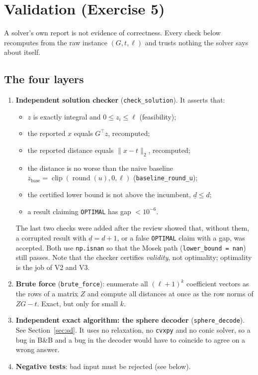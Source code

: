 \documentclass[11pt,a4paper]{article}
\newcommand{\norm}[1]{\lVert #1\rVert_2}
\newcommand{\BB}{B\&B}
\begin{document}
\section{Validation (Exercise 5)}

A solver's own report is not evidence of correctness. Every check below recomputes from the raw instance $(G,t,\ell)$ and trusts nothing the solver says about itself.

\subsection{The four layers}

\begin{enumerate}[label=\textbf{V\arabic*.}]
  \item \textbf{Independent solution checker} (\texttt{check\_solution}). It asserts that:
  \begin{itemize}
    \item $z$ is exactly integral and $0\le z_i\le\ell$ (feasibility);
    \item the reported $x$ equals $G^\top z$, recomputed;
    \item the reported distance equals $\norm{x-t}$, recomputed;
    \item the distance is no worse than the naive baseline $z_{\text{base}}=\operatorname{clip}(\operatorname{round}(u),0,\ell)$ (\texttt{baseline\_round\_u});
    \item the certified lower bound is not above the incumbent, $\underline d\le d$;
    \item a result claiming \texttt{OPTIMAL} has gap $<10^{-6}$.
  \end{itemize}
  The last two checks were added after the review showed that, without them, a corrupted result with $\underline d=d+1$, or a false \texttt{OPTIMAL} claim with a gap, was accepted. Both use \texttt{np.isnan} so that the Mosek path (\texttt{lower\_bound = nan}) still passes. Note that the checker certifies \emph{validity}, not optimality; optimality is the job of V2 and V3.
  \item \textbf{Brute force} (\texttt{brute\_force}): enumerate all $(\ell+1)^k$ coefficient vectors as the rows of a matrix $Z$ and compute all distances at once as the row norms of $ZG-t$. Exact, but only for small $k$.
  \item \textbf{Independent exact algorithm: the sphere decoder} (\texttt{sphere\_decode}). See Section~\ref{sec:sd}. It uses no relaxation, no \texttt{cvxpy} and no conic solver, so a bug in \BB{} and a bug in the decoder would have to coincide to agree on a wrong answer.
  \item \textbf{Negative tests}: bad input must be rejected (see below).
\end{enumerate}
\end{document}
